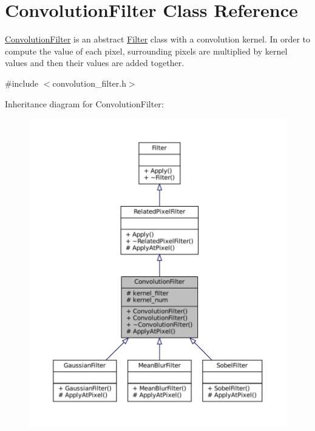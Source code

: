 \hypertarget{classConvolutionFilter}{}\section{Convolution\+Filter Class Reference}
\label{classConvolutionFilter}


\hyperlink{classConvolutionFilter}{Convolution\+Filter} is an abstract \hyperlink{classFilter}{Filter} class with a convolution kernel. In order to compute the value of each pixel, surrounding pixels are multiplied by kernel values and then their values are added together.  




{\ttfamily \#include $<$convolution\+\_\+filter.\+h$>$}



Inheritance diagram for Convolution\+Filter\+:\nopagebreak
\begin{figure}[H]
\begin{center}
\leavevmode
\includegraphics[width=350pt]{classConvolutionFilter__inherit__graph}
\end{center}
\end{figure}


